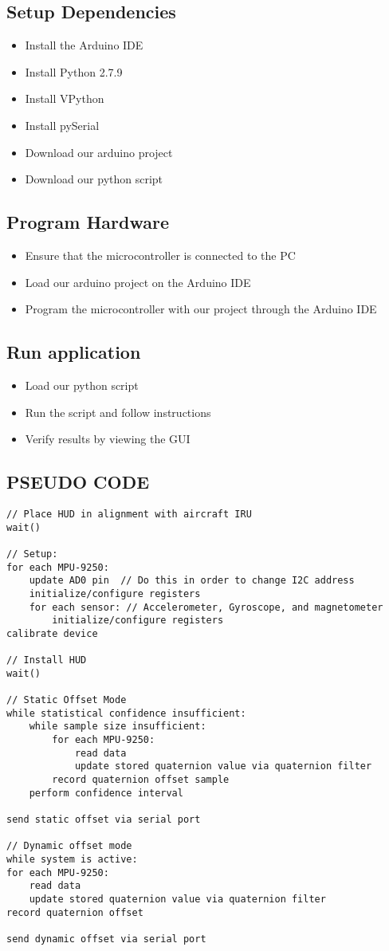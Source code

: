 \subsection{Setup Dependencies}
\begin{itemize}
\item{Install the Arduino IDE}
\item{Install Python 2.7.9}
\item{Install VPython}
\item{Install pySerial}
\item{Download our arduino project}
\item{Download our python script}
\end{itemize}

\subsection{Program Hardware}
\begin{itemize}
\item{Ensure that the microcontroller is connected to the PC}
\item{Load our arduino project on the Arduino IDE}
\item{Program the microcontroller with our project through the Arduino IDE}
\end{itemize}

\subsection{Run application}
\begin{itemize}
\item{Load our python script}
\item{Run the script and follow instructions}
\item{Verify results by viewing the GUI}
\end{itemize}

\subsection{PSEUDO CODE}
\begin{lstlisting}
// Place HUD in alignment with aircraft IRU
wait()
 
// Setup:
for each MPU-9250:
	update AD0 pin	// Do this in order to change I2C address
	initialize/configure registers
	for each sensor: // Accelerometer, Gyroscope, and magnetometer
		initialize/configure registers
calibrate device
 
// Install HUD
wait()
 
// Static Offset Mode
while statistical confidence insufficient:
	while sample size insufficient:
		for each MPU-9250:
			read data
			update stored quaternion value via quaternion filter
		record quaternion offset sample
	perform confidence interval
 
send static offset via serial port
 
// Dynamic offset mode
while system is active:
for each MPU-9250:
	read data
	update stored quaternion value via quaternion filter
record quaternion offset
 
send dynamic offset via serial port
\end{lstlisting}